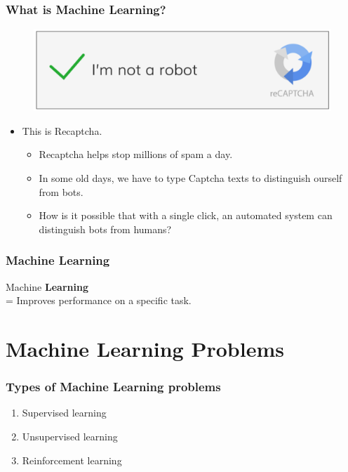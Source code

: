 \documentclass[aspectratio=169]{beamer}
\begin{document}
\begin{frame}
	\frametitle{What is Machine Learning?}
	\pause
	\begin{figure}
		\includegraphics[scale=0.4]{imgs/recaptcha.png}
	\end{figure}
	\begin{itemize}
		\pause
		\item This is Recaptcha.
		      \begin{itemize}
			      \pause
			      \item Recaptcha helps stop millions of spam a day.
			            \pause
			      \item In some old days, we have to type Captcha texts to distinguish ourself from bots.
			            \pause
			      \item How is it possible that with a single click, an automated system can distinguish bots from humans?
		      \end{itemize}
	\end{itemize}
\end{frame}

\begin{frame}
	\frametitle{Machine Learning}
	\begin{center}
		Machine \textbf{Learning} \\
		\onslide<2-> \huge = Improves performance on a specific task.
	\end{center}
\end{frame}

\section{Machine Learning Problems}

\begin{frame}
	\frametitle{Types of Machine Learning problems}
	\begin{enumerate}
		\item<2-> Supervised learning
		\item<3-> Unsupervised learning
		\item<4-> Reinforcement learning
	\end{enumerate}
\end{frame}
\end{document}
